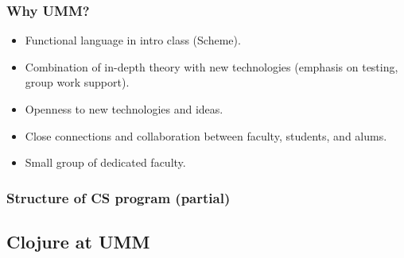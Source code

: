 \documentclass{beamer}
\begin{document}
\begin{frame}
  \frametitle{Why UMM?}
\begin{itemize}
\item Functional language in intro class (Scheme).
\item Combination of in-depth theory with new technologies (emphasis on testing, group work support).
\item Openness to new technologies and ideas.
\item Close connections and collaboration between faculty, students, and alums. 
\item Small group of dedicated faculty. 
\end{itemize}
\end{frame}

\begin{frame}
  \frametitle{Structure of CS program (partial)}
{\small
{}
}
\end{frame}

\subsection{Clojure at UMM}
\end{document}
